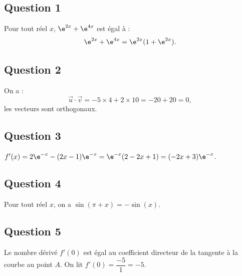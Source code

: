 \subsection*{Question 1}

Pour tout réel \(x\), \( \e^{2x} + \e^{4x} \) est égal à :
\[
\e^{2x} + \e^{4x} = \e^{2x}(1 + \e^{2x}).
\]

\subsection*{Question 2}

On a :
\[
\vec{u} \cdot \vec{v} = -5 \times 4 + 2 \times 10 = -20 + 20 = 0,
\]
les vecteurs sont orthogonaux.

\subsection*{Question 3}

\(f'(x) = 2\e^{-x} - (2x - 1)\e^{-x} = \e^{-x} (2 - 2x + 1) = (-2x + 3)\e^{-x}\).

\subsection*{Question 4}

Pour tout réel \(x\), on a \(\sin(\pi + x) = -\sin(x)\).

\subsection*{Question 5}

Le nombre dérivé \(f'(0)\) est égal au coefficient directeur de la tangente à la courbe au point \(A\). On lit \(f'(0) = \dfrac{-5}{1}= -5\).
